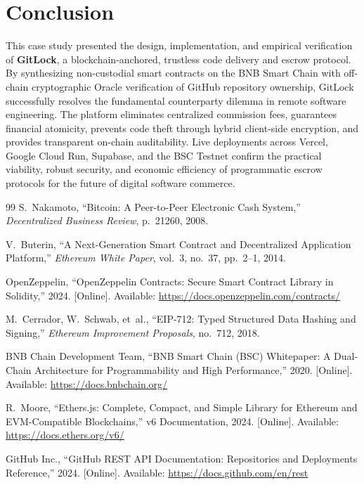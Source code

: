 \documentclass[11pt,a4paper]{article}
\begin{document}
\section{Conclusion}
This case study presented the design, implementation, and empirical verification of \textbf{GitLock}, a blockchain-anchored, trustless code delivery and escrow protocol. By synthesizing non-custodial smart contracts on the BNB Smart Chain with off-chain cryptographic Oracle verification of GitHub repository ownership, GitLock successfully resolves the fundamental counterparty dilemma in remote software engineering. The platform eliminates centralized commission fees, guarantees financial atomicity, prevents code theft through hybrid client-side encryption, and provides transparent on-chain auditability. Live deployments across Vercel, Google Cloud Run, Supabase, and the BSC Testnet confirm the practical viability, robust security, and economic efficiency of programmatic escrow protocols for the future of digital software commerce.

\begin{thebibliography}{99}
S.~Nakamoto, ``Bitcoin: A Peer-to-Peer Electronic Cash System,'' \textit{Decentralized Business Review}, p.~21260, 2008.

V.~Buterin, ``A Next-Generation Smart Contract and Decentralized Application Platform,'' \textit{Ethereum White Paper}, vol.~3, no.~37, pp.~2--1, 2014.

OpenZeppelin, ``OpenZeppelin Contracts: Secure Smart Contract Library in Solidity,'' 2024. [Online]. Available: \url{https://docs.openzeppelin.com/contracts/}

M.~Cerrador, W.~Schwab, et~al., ``EIP-712: Typed Structured Data Hashing and Signing,'' \textit{Ethereum Improvement Proposals}, no.~712, 2018.

BNB Chain Development Team, ``BNB Smart Chain (BSC) Whitepaper: A Dual-Chain Architecture for Programmability and High Performance,'' 2020. [Online]. Available: \url{https://docs.bnbchain.org/}

R.~Moore, ``Ethers.js: Complete, Compact, and Simple Library for Ethereum and EVM-Compatible Blockchains,'' v6 Documentation, 2024. [Online]. Available: \url{https://docs.ethers.org/v6/}

GitHub Inc., ``GitHub REST API Documentation: Repositories and Deployments Reference,'' 2024. [Online]. Available: \url{https://docs.github.com/en/rest}
\end{thebibliography}
\end{document}

